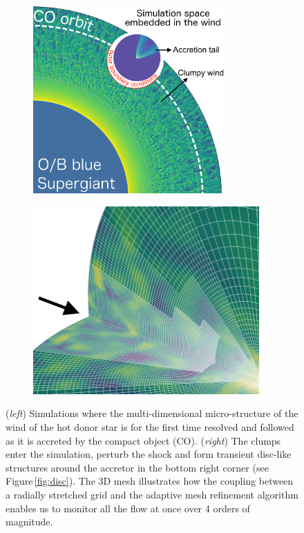\documentclass[12pt,onecolumn]{article}
\begin{document}
\begin{figure}[!t]
  \hspace*{-2.2cm}
\begin{subfigure}{0.45\columnwidth}
  \includegraphics[height=7.2cm]{Figures/config_SgXB_clumps.png}	
\end{subfigure}%
\begin{subfigure}{0.45\columnwidth}
  \hspace*{0.7cm}
  \includegraphics[height=7.2cm]{Figures/mesh.jpeg}	
\end{subfigure}
\caption{(\textit{left}) Simulations where the multi-dimensional micro-structure of the wind of the hot donor star is for the first time resolved and followed as it is accreted by the compact object (CO). (\textit{right}) The clumps enter the simulation, perturb the shock and form transient disc-like structures around the accretor in the bottom right corner (see Figure\,\ref{fig:disc}). The 3D mesh illustrates how the coupling between a radially stretched grid and the adaptive mesh refinement algorithm enables us to monitor all the flow at once over 4 orders of magnitude.}
\label{fig:config_SgXB_and_mesh}
\end{figure}
\end{document}
